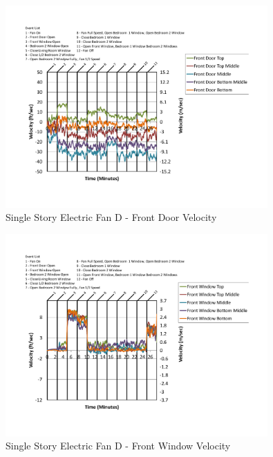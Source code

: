 \documentclass{article}
\begin{document}
\begin{appendices}
	\begin{figure}[H]
		\centering
		\includegraphics[height=3.05in,trim=0.67in 1.1in 0.67in 0.8in,clip=true]{0_Images/Results_Charts/ColdFlow/Single_Story/Electric/D/Front_Door_Velocity.pdf}
		\caption{Single Story Electric Fan D - Front Door Velocity}
	\end{figure}
 

	\begin{figure}[H]
		\centering
		\includegraphics[height=3.05in,trim=0.67in 1.1in 0.67in 0.8in,clip=true]{0_Images/Results_Charts/ColdFlow/Single_Story/Electric/D/Front_Window_Velocity.pdf}
		\caption{Single Story Electric Fan D - Front Window Velocity}
	\end{figure}
 
	\clearpage


\end{appendices}
\end{document}
